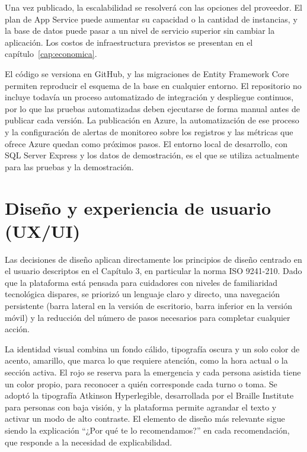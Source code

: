 Una vez publicado, la escalabilidad se resolverá con las opciones del proveedor. El plan de App Service puede aumentar su capacidad o la cantidad de instancias, y la base de datos puede pasar a un nivel de servicio superior sin cambiar la aplicación. Los costos de infraestructura previstos se presentan en el capítulo~\ref{cap:economica}.

El código se versiona en GitHub, y las migraciones de Entity Framework Core permiten reproducir el esquema de la base en cualquier entorno. El repositorio no incluye todavía un proceso automatizado de integración y despliegue continuos, por lo que las pruebas automatizadas deben ejecutarse de forma manual antes de publicar cada versión. La publicación en Azure, la automatización de ese proceso y la configuración de alertas de monitoreo sobre los registros y las métricas que ofrece Azure quedan como próximos pasos. El entorno local de desarrollo, con SQL Server Express y los datos de demostración, es el que se utiliza actualmente para las pruebas y la demostración.

\section{Diseño y experiencia de usuario (UX/UI)}

Las decisiones de diseño aplican directamente los principios de diseño centrado en el usuario descriptos en el Capítulo 3, en particular la norma ISO 9241-210. Dado que la plataforma está pensada para cuidadores con niveles de familiaridad tecnológica dispares, se priorizó un lenguaje claro y directo, una navegación persistente (barra lateral en la versión de escritorio, barra inferior en la versión móvil) y la reducción del número de pasos necesarios para completar cualquier acción.

La identidad visual combina un fondo cálido, tipografía oscura y un solo color de acento, amarillo, que marca lo que requiere atención, como la hora actual o la sección activa. El rojo se reserva para la emergencia y cada persona asistida tiene un color propio, para reconocer a quién corresponde cada turno o toma. Se adoptó la tipografía Atkinson Hyperlegible, desarrollada por el Braille Institute \citep{braille2019} para personas con baja visión, y la plataforma permite agrandar el texto y activar un modo de alto contraste. El elemento de diseño más relevante sigue siendo la explicación ``¿Por qué te lo recomendamos?'' en cada recomendación, que responde a la necesidad de explicabilidad.


